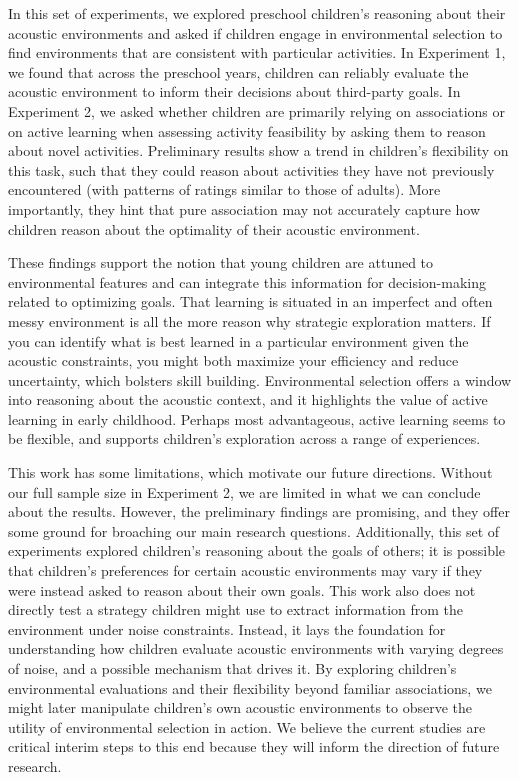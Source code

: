 \documentclass[10pt, letterpaper]{article}
\begin{document}
In this set of experiments, we explored preschool children's reasoning
about their acoustic environments and asked if children engage in
environmental selection to find environments that are consistent with
particular activities. In Experiment 1, we found that across the
preschool years, children can reliably evaluate the acoustic environment
to inform their decisions about third-party goals. In Experiment 2, we
asked whether children are primarily relying on associations or on
active learning when assessing activity feasibility by asking them to
reason about novel activities. Preliminary results show a trend in
children's flexibility on this task, such that they could reason about
activities they have not previously encountered (with patterns of
ratings similar to those of adults). More importantly, they hint that
pure association may not accurately capture how children reason about
the optimality of their acoustic environment.

These findings support the notion that young children are attuned to
environmental features and can integrate this information for
decision-making related to optimizing goals. That learning is situated
in an imperfect and often messy environment is all the more reason why
strategic exploration matters. If you can identify what is best learned
in a particular environment given the acoustic constraints, you might
both maximize your efficiency and reduce uncertainty, which bolsters
skill building. Environmental selection offers a window into reasoning
about the acoustic context, and it highlights the value of active
learning in early childhood. Perhaps most advantageous, active learning
seems to be flexible, and supports children's exploration across a range
of experiences.

This work has some limitations, which motivate our future directions.
Without our full sample size in Experiment 2, we are limited in what we
can conclude about the results. However, the preliminary findings are
promising, and they offer some ground for broaching our main research
questions. Additionally, this set of experiments explored children's
reasoning about the goals of others; it is possible that children's
preferences for certain acoustic environments may vary if they were
instead asked to reason about their own goals. This work also does not
directly test a strategy children might use to extract information from
the environment under noise constraints. Instead, it lays the foundation
for understanding how children evaluate acoustic environments with
varying degrees of noise, and a possible mechanism that drives it. By
exploring children's environmental evaluations and their flexibility
beyond familiar associations, we might later manipulate children's own
acoustic environments to observe the utility of environmental selection
in action. We believe the current studies are critical interim steps to
this end because they will inform the direction of future research.
\end{document}
